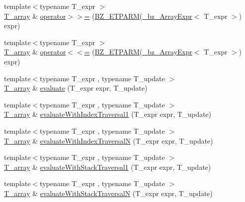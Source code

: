 \begin{DoxyCompactItemize}
\item 
{\footnotesize template$<$typename T\+\_\+expr $>$ }\\\hyperlink{classArray_a6a3d9b6a214107a10df219091801f1e0}{T\+\_\+array} \& \hyperlink{classArray_a86d6e14efb0893b8a6546bbbe2974217}{operator$>$$>$=} (\hyperlink{tuning_8h_a92a6f3aa8f4cd5ac9b4239c449892bb7}{B\+Z\+\_\+\+E\+T\+P\+A\+R\+M}(\hyperlink{class__bz__ArrayExpr}{\+\_\+bz\+\_\+\+Array\+Expr}$<$ T\+\_\+expr $>$) expr)
\item 
{\footnotesize template$<$typename T\+\_\+expr $>$ }\\\hyperlink{classArray_a6a3d9b6a214107a10df219091801f1e0}{T\+\_\+array} \& \hyperlink{classArray_aa62d94d61dc2f9ed390105017343ba56}{operator$<$$<$=} (\hyperlink{tuning_8h_a92a6f3aa8f4cd5ac9b4239c449892bb7}{B\+Z\+\_\+\+E\+T\+P\+A\+R\+M}(\hyperlink{class__bz__ArrayExpr}{\+\_\+bz\+\_\+\+Array\+Expr}$<$ T\+\_\+expr $>$) expr)
\item 
{\footnotesize template$<$typename T\+\_\+expr , typename T\+\_\+update $>$ }\\\hyperlink{classArray_a6a3d9b6a214107a10df219091801f1e0}{T\+\_\+array} \& \hyperlink{classArray_af8cdc3046c635f38995fabbda28136b1}{evaluate} (T\+\_\+expr expr, T\+\_\+update)
\item 
{\footnotesize template$<$typename T\+\_\+expr , typename T\+\_\+update $>$ }\\\hyperlink{classArray_a6a3d9b6a214107a10df219091801f1e0}{T\+\_\+array} \& \hyperlink{classArray_a3abedb39f2d8a4a43d30455f25337c59}{evaluate\+With\+Index\+Traversal1} (T\+\_\+expr expr, T\+\_\+update)
\item 
{\footnotesize template$<$typename T\+\_\+expr , typename T\+\_\+update $>$ }\\\hyperlink{classArray_a6a3d9b6a214107a10df219091801f1e0}{T\+\_\+array} \& \hyperlink{classArray_aac7747593f0c32b84cdb762afb283d90}{evaluate\+With\+Index\+Traversal\+N} (T\+\_\+expr expr, T\+\_\+update)
\item 
{\footnotesize template$<$typename T\+\_\+expr , typename T\+\_\+update $>$ }\\\hyperlink{classArray_a6a3d9b6a214107a10df219091801f1e0}{T\+\_\+array} \& \hyperlink{classArray_a106966bbdf83dad2f4811d6e4136d38e}{evaluate\+With\+Stack\+Traversal1} (T\+\_\+expr expr, T\+\_\+update)
\item 
{\footnotesize template$<$typename T\+\_\+expr , typename T\+\_\+update $>$ }\\\hyperlink{classArray_a6a3d9b6a214107a10df219091801f1e0}{T\+\_\+array} \& \hyperlink{classArray_a3380f92ce1640b5863942add3f82051d}{evaluate\+With\+Stack\+Traversal\+N} (T\+\_\+expr expr, T\+\_\+update)

\end{DoxyCompactItemize}
